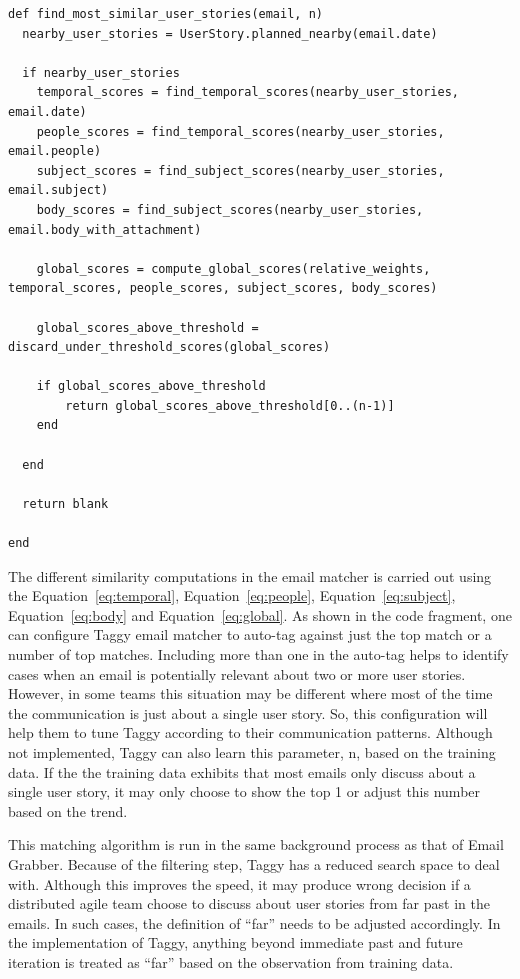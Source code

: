 \begin{verbatim}
def	find_most_similar_user_stories(email, n)
  nearby_user_stories = UserStory.planned_nearby(email.date)

  if nearby_user_stories
    temporal_scores = find_temporal_scores(nearby_user_stories, email.date)
    people_scores = find_temporal_scores(nearby_user_stories, email.people)
    subject_scores = find_subject_scores(nearby_user_stories, email.subject)
    body_scores = find_subject_scores(nearby_user_stories, email.body_with_attachment)

    global_scores = compute_global_scores(relative_weights, temporal_scores, people_scores, subject_scores, body_scores)

    global_scores_above_threshold =  discard_under_threshold_scores(global_scores)

    if global_scores_above_threshold
    	return global_scores_above_threshold[0..(n-1)]
    end
		
  end
	
  return blank
	
end
\end{verbatim}

The different similarity computations in the email matcher is carried out using the Equation~\ref{eq:temporal}, Equation~\ref{eq:people}, Equation~\ref{eq:subject}, Equation~\ref{eq:body} and Equation~\ref{eq:global}. As shown in the code fragment, one can configure Taggy email matcher to auto-tag against just the top match or a number of top matches. Including more than one in the auto-tag helps to identify cases when an email is potentially relevant about two or more user stories. However, in some teams this situation may be different where most of the time the communication is just about a single user story. So, this configuration will help them to tune Taggy according to their communication patterns. Although not implemented, Taggy can also learn this parameter, n, based on the training data. If the the training data exhibits that most emails only discuss about a single user story, it may only choose to show the top 1 or adjust this number based on the trend.

This matching algorithm is run in the same background process as that of Email Grabber. Because of the filtering step, Taggy has a reduced search space to deal with. Although this improves the speed, it may produce wrong decision if a distributed agile team choose to discuss about user stories from far past in the emails. In such cases, the definition of ``far'' needs to be adjusted accordingly. In the implementation of Taggy, anything beyond immediate past and future iteration is treated as ``far'' based on the observation from training data.


